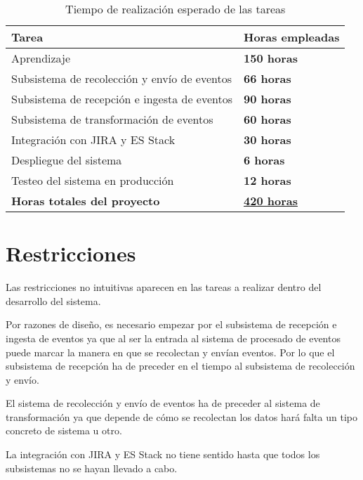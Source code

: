 \begin{table}[H]\label{tabla:tiempotareas}
	\centering
	\begin{tabular}{|l|l|}
		\hline
		\textbf{Tarea}                               & \textbf{Horas empleadas}                  \\ \hline
		Aprendizaje                                  & \textbf{150 horas}                        \\ \hline
		Subsistema de recolección y envío de eventos & \textbf{66 horas}                         \\ \hline
		Subsistema de recepción e ingesta de eventos & \textbf{90 horas}                         \\ \hline
		Subsistema de transformación de eventos      & \textbf{60 horas}                         \\ \hline
		Integración con JIRA y ES Stack              & \textbf{30 horas}                         \\ \hline
		Despliegue del sistema                       & \textbf{6 horas}                          \\ \hline
		Testeo del sistema en producción             & \textbf{12 horas}                         \\ \hline
		\textbf{Horas totales del proyecto}          & \underline{\textbf{420 horas}}            \\ \hline
	\end{tabular}
	\caption{Tiempo de realización esperado de las tareas}
\end{table}

\section{Restricciones}
Las restricciones no intuitivas aparecen en las tareas a realizar dentro del desarrollo del sistema. 

Por razones de diseño, es necesario empezar por el subsistema de recepción e ingesta de eventos ya que al ser la entrada al sistema de procesado de eventos puede marcar la manera en que se recolectan y envían eventos. Por lo que el subsistema de recepción ha de preceder en el tiempo al subsistema de recolección y envío.

El sistema de recolección y envío de eventos ha de preceder al sistema de transformación ya que depende de cómo se recolectan los datos hará falta un tipo concreto de sistema u otro.

La integración con JIRA y ES Stack no tiene sentido hasta que todos los subsistemas no se hayan llevado a cabo.

